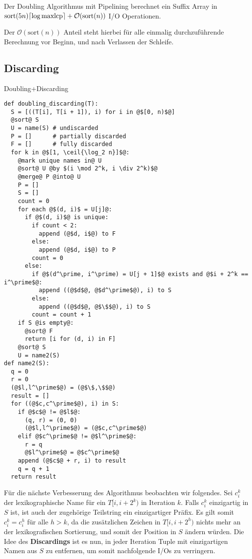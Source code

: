 \begin{theorem}
Der Doubling Algorithmus mit Pipelining berechnet ein Suffix Array in\\ $\text{sort}(5n) \ceil*{\log \text{maxlcp}} +  \mathcal{O}(\text{sort}(n))$ I/O Operationen.
\end{theorem}

Der $\mathcal{O}(\text{sort}(n))$ Anteil steht hierbei für alle einmalig durchzuführende Berechnung vor Beginn, und nach Verlassen der Schleife.

\subsection{Discarding}
\label{algo:doubling:sec:discarding}

\begin{listing}[htp]
\caption{Doubling+Discarding} 
\label{algo:doubling:code:discarding}
\begin{verbatim}
def doubling_discarding(T):
  S = [((T[i], T[i + 1]), i) for i in @$[0, n)$@]
  @sort@ S
  U = name(S) # undiscarded
  P = []      # partially discarded
  F = []      # fully discarded
  for k in @$[1, \ceil{\log_2 n}]$@:
    @mark unique names in@ U
    @sort@ U @by $(i \mod 2^k, i \div 2^k)$@
    @merge@ P @into@ U
    P = []
    S = []
    count = 0
    for each @$(d, i)$ = U[j]@:
      if @$(d, i)$@ is unique:
        if count < 2:
          append (@$d, i$@) to F
        else:
          append (@$d, i$@) to P
        count = 0
      else:
        if @$(d^\prime, i^\prime) = U[j + 1]$@ exists and @$i + 2^k == i^\prime$@:
          append ((@$d$@, @$d^\prime$@), i) to S
        else:
          append ((@$d$@, @$\$$@), i) to S
        count = count + 1
    if S @is empty@:
      @sort@ F
      return [i for (d, i) in F]
    @sort@ S
    U = name2(S)
def name2(S):
  q = 0
  r = 0
  (@$l,l^\prime$@) = (@$\$,\$$@)
  result = []
  for ((@$c,c^\prime$@), i) in S:
    if @$c$@ != @$l$@:
      (q, r) = (0, 0)
      (@$l,l^\prime$@) = (@$c,c^\prime$@)
    elif @$c^\prime$@ != @$l^\prime$@:
      r = q
      @$l^\prime$@ = @$c^\prime$@
    append (@$c$@ + r, i) to result
    q = q + 1
  return result
\end{verbatim}
\end{listing}

Für die nächste Verbesserung des Algorithmus beobachten wir folgendes. Sei $c_i^k$ der lexikographische Name für ein $T[i, i + 2^k)$ in Iteration $k$. Falls $c_i^k$ einzigartig in $S$ ist, ist auch der zugehörige Teilstring ein einzigartiger Präfix. Es gilt somit $c_i^k = c_i^h$ für alle $h > k$, da die zusätzlichen Zeichen in $T[i, i + 2^h)$ nichts mehr an der lexikografischen Sortierung, und somit der Position in $S$ ändern würden. Die Idee des \textbf{Discardings} ist es nun, in jeder Iteration Tuple mit einzigartigen Namen aus $S$ zu entfernen, um somit nachfolgende I/Os zu verringern. 

